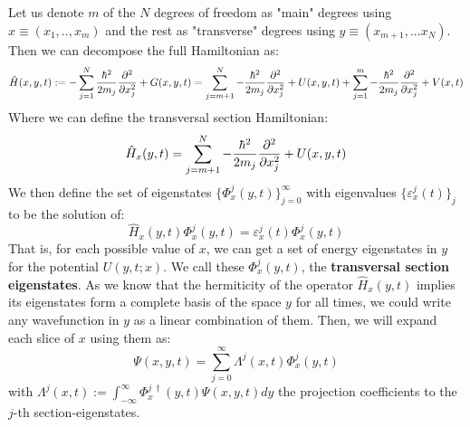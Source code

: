 \documentclass[11pt, a4paper]{article} %
\begin{document}
Let us denote $m$ of the $N$ degrees of freedom as "main" degrees using $x\equiv(x_1,..,x_m)$ and the rest as "transverse" degrees using $y\equiv(x_{m+1},...x_N)$. Then we can decompose the full Hamiltonian as:
\begin{equation}
\hat{H}(x, y, t):= -\sum_{j=1}^N\frac{\hbar^2}{2m_j}\pdv[2]{}{x_j}+G(x, y, t)=\sum_{j=m+1}^{N}-\frac{\hbar^2}{2m_j}\pdv[2]{}{x_j}+U(x, y, t)+\sum_{j=1}^{m}-\frac{\hbar^2}{2m_j}\pdv[2]{}{x_j}+V(x,t)
\end{equation}
Where we can define the transversal section Hamiltonian:\vspace{-0.05cm}
\begin{equation}
\hat{H}_x(y,t)=\sum_{j=m+1}^{N}-\frac{\hbar^2}{2m_j}\pdv[2]{}{x_j}+U(x, y, t)
\end{equation} \vspace{-0.2cm}
We then define the set of eigenstates $\{\Phi^j_x(y,t)\}_{j=0}^\infty$ with eigenvalues $\{\varepsilon_x^j(t)\}_j$ to be the solution of:\vspace{0.2cm}
\begin{equation}\label{transvE}
\hat{H}_x(y,t)\Phi^j_x(y,t)=\varepsilon^j_x(t)\Phi^j_x(y,t)
\end{equation}
That is, for each possible value of $x$, we can get a set of energy eigenstates in $y$ for the potential $U(y,t;x)$. We call these $\Phi^j_x(y,t)$, the {\bf transversal section eigenstates}. As we know that the hermiticity of the operator $\hat{H}_x(y,t)$ implies its eigenstates form a complete basis of the space $y$ for all times, we could write any wavefunction in $y$ as a linear combination of them. Then, we will expand each slice of $x$ using them as:\vspace{-0.2cm}
\begin{equation}\label{BHExp}
\Psi(x,y,t)=\sum_{j=0}^\infty \Lambda^j(x,t) \Phi^j_x(y,t)
\end{equation}\vspace{-0.2cm}
with $\Lambda^j(x,t):= \int_{-\infty}^{\infty}\Phi^{j\ \dagger}_x(y,t) \Psi(x,y,t)dy$ the projection coefficients to the $j$-th section-eigenstates.
\end{document}

